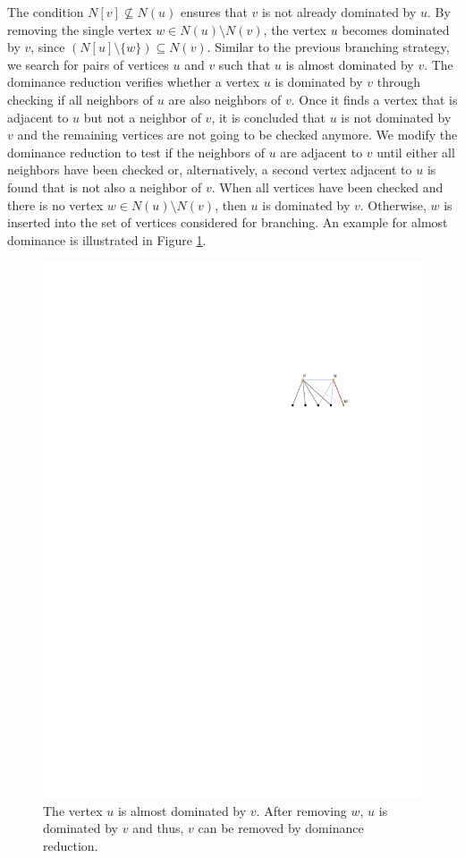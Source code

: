 \documentclass[12pt,a4paper,twoside]{scrartcl}
\numberwithin{equation}{section}
\begin{document}
The condition $N[v]\not\subseteq N(u)$ ensures that $v$ is not already dominated by $u$. By removing the single vertex $w\in N(u)\setminus N(v)$, the vertex $u$ becomes dominated by $v$, since $(N[u]\setminus\{w\})\subseteq N(v)$. Similar to the previous branching strategy, we search for pairs of vertices $u$ and $v$ such that $u$ is almost dominated by $v$. The dominance reduction verifies whether a vertex $u$ is dominated by $v$ through checking if all neighbors of $u$ are also neighbors of $v$. Once it finds a vertex that is adjacent to $u$ but not a neighbor of $v$, it is concluded that $u$ is not dominated by $v$ and the remaining vertices are not going to be checked anymore. We modify the dominance reduction to test if the neighbors of $u$ are adjacent to $v$ until either all neighbors have been checked or, alternatively, a second vertex adjacent to $u$ is found that is not also a neighbor of $v$. When all vertices have been checked and there is no vertex $w \in N(u)\setminus N(v)$, then $u$ is dominated by $v$. Otherwise, $w$ is inserted into the set of vertices considered for branching. An example for almost dominance is illustrated in Figure \ref{fig:alm_dom}.\\

\begin{figure}[htb]
	\captionsetup{belowskip=-1em}
	\includegraphics[scale=1.5]{images/alm_dom}
	\centering
	\caption{The vertex $u$ is almost dominated by $v$. After removing $w$, $u$ is dominated by $v$ and thus, $v$ can be removed by dominance reduction.}
	\label{fig:alm_dom}
\end{figure}
\end{document}

